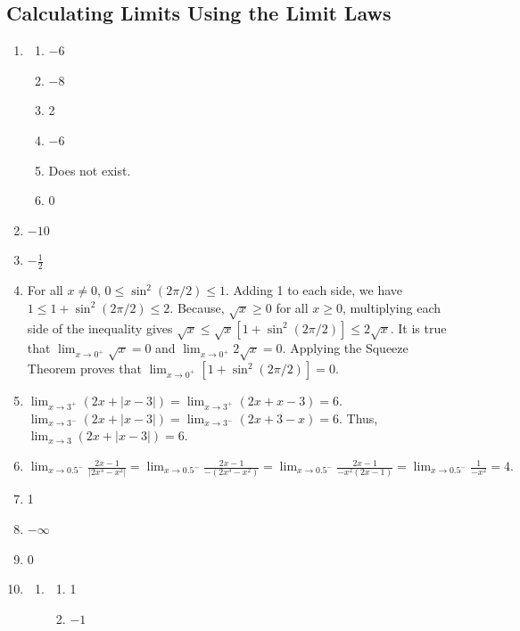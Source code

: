 \documentclass{article}
\begin{document}
\subsection{Calculating Limits Using the Limit Laws}
\begin{enumerate}
  \item \begin{enumerate}[label=(\alph*)]
          \item $-6$
          \item $-8$
          \item 2
          \item $-6$
          \item Does not exist.
          \item 0
        \end{enumerate}
        \setcounter{enumi}{16}
  \item $-10$
        \setcounter{enumi}{28}
  \item $-\frac{1}{2}$
        \setcounter{enumi}{39}
  \item For all $x \ne 0$, $0 \le \sin^2(2\pi/2) \le 1$. Adding 1 to each side, we have $ 1 \le
          1+\sin^2(2\pi/2) \le 2$. Because, $\sqrt{x} \ge 0$ for all $x \ge 0$, multiplying
        each side of the inequality gives $\sqrt{x} \le \sqrt{x}[1+\sin^2(2\pi/2)] \le
          2\sqrt{x}$. It is true that $\lim_{x \to 0^+}{\sqrt{x}} = 0$ and $\lim_{x \to 0^+}
          {2\sqrt{x}} = 0$. Applying the Squeeze Theorem proves that $\lim_{x \to 0^+}
          {[1+\sin^2(2\pi/2)]} = 0$.
  \item $\lim_{x\to3^+}\left(2x+|x-3|\right) = \lim_{x\to3^+}(2x+x-3) = 6$. $\lim_{x\to3^-}
          \left(2x+|x-3|\right) = \lim_{x\to3^-}(2x+3-x) = 6$. Thus, $\lim_{x\to3}
          \left(2x+|x-3|\right) = 6$.
        \setcounter{enumi}{42}
  \item $\lim_{x\to0.5^-}\frac{2x-1}{\left|2x^3-x^2\right|} =
          \lim_{x\to0.5^-}\frac{2x-1}{-(2x^3-x^2)} = \lim_{x\to0.5^-}\frac{2x-1}{-x^2(2x-1)}
          = \lim_{x\to0.5^-}\frac{1}{-x^2} = 4.$
  \item 1
  \item $-\infty$
  \item 0
  \item \begin{enumerate}[label=(\alph*), start=2]
          \item \begin{enumerate}[label=(\roman*)]
                  \item 1
                  \item $-1$

\end{enumerate}
\end{enumerate}
\end{enumerate}
\end{document}

